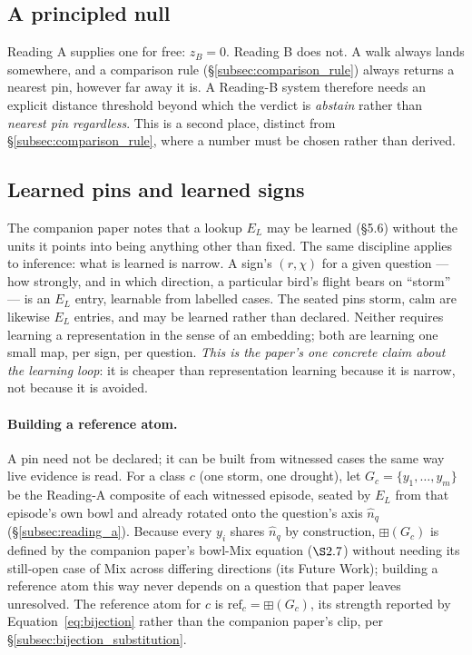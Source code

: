 \documentclass[12pt, a4paper]{article}
\begin{document}
\subsection{A principled null}
\label{subsec:the_null}
Reading A supplies one for free: $z_B=0$. Reading B does not. A walk
always lands somewhere, and a comparison rule (\S\ref{subsec:comparison_rule})
always returns a nearest pin, however far away it is. A Reading-B
system therefore needs an explicit distance threshold beyond which the
verdict is \emph{abstain} rather than \emph{nearest pin regardless}.
This is a second place, distinct from \S\ref{subsec:comparison_rule},
where a number must be chosen rather than derived.

\subsection{Learned pins and learned signs}
\label{subsec:learned_pins}
The companion paper notes that a lookup $E_L$ may be learned
(\S5.6) without the units it points into being anything other than
fixed. The same discipline applies to inference: what is learned is
narrow. A sign's $(r,\chi)$ for a given question --- how strongly, and
in which direction, a particular bird's flight bears on ``storm'' ---
is an $E_L$ entry, learnable from labelled cases. The seated pins
$\mathrm{storm}$, $\mathrm{calm}$ are likewise $E_L$ entries, and may
be learned rather than declared. Neither requires learning a
representation in the sense of an embedding; both are learning one
small map, per sign, per question. \emph{This is the paper's one
concrete claim about the learning loop}: it is cheaper than
representation learning because it is narrow, not because it is
avoided.

\paragraph{Building a reference atom.}
\label{par:reference_atom}
A pin need not be declared; it can be built from witnessed cases the
same way live evidence is read. For a class $c$ (one storm, one
drought), let $G_c=\{y_1,\ldots,y_m\}$ be the Reading-A composite of
each witnessed episode, seated by $E_L$ from that episode's own bowl
and already rotated onto the question's axis $\hat n_q$
(\S\ref{subsec:reading_a}). Because every $y_i$ shares $\hat
n_q$ by construction, $\boxplus(G_c)$ is defined by the
companion paper's bowl-Mix equation ($\S2.7$) without needing its
still-open case of Mix across differing directions (its Future Work);
building a reference atom this way
never depends on a question that paper leaves unresolved. The
reference atom for $c$ is $\mathrm{ref}_c=\boxplus(G_c)$, its strength
reported by Equation~\eqref{eq:bijection} rather than the companion
paper's clip, per \S\ref{subsec:bijection_substitution}.
\end{document}
